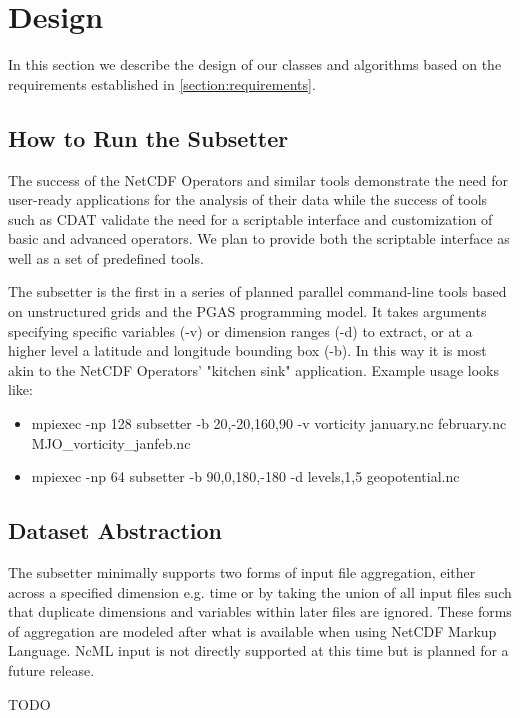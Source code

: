 \section{Design}
\label{section:design}

In this section we describe the design of our classes and algorithms based on
the requirements established in \ref{section:requirements}.

\subsection{How to Run the Subsetter}

The success of the NetCDF Operators and similar tools demonstrate the need for
user-ready applications for the analysis of their data while the success of
tools such as CDAT validate the need for a scriptable interface and customization of
basic and advanced operators.  We plan to provide both the scriptable
interface as well as a set of predefined tools.

The subsetter is the first in a series of planned parallel command-line tools
based on unstructured grids and the PGAS programming model.  It takes
arguments specifying specific variables (-v) or dimension ranges (-d) to
extract, or at a higher level a latitude and longitude bounding box (-b).  In
this way it is most akin to the NetCDF Operators' "kitchen sink" application.
Example usage looks like: \begin{itemize} \item mpiexec -np 128 subsetter -b
20,-20,160,90 -v vorticity january.nc february.nc MJO\_vorticity\_janfeb.nc
\item mpiexec -np 64 subsetter -b 90,0,180,-180 -d levels,1,5 geopotential.nc
\end{itemize}

\subsection{Dataset Abstraction}

The subsetter minimally supports two forms of input file aggregation, either
across a specified dimension e.g. time or by taking the union of all input
files such that duplicate dimensions and variables within later files are
ignored.  These forms of aggregation are modeled after what is available when
using NetCDF Markup Language.\cite{NcML} NcML input is not directly supported
at this time but is planned for a future release. 

TODO


